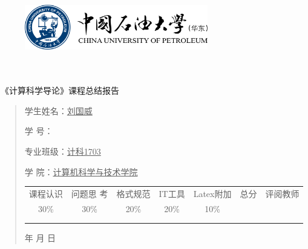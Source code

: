 \documentclass{article}
\renewcommand{\today}{\number\year 年 \number\month 月 \number\day 日}
\begin{document}
\begin{figure}
    \centering
    \includegraphics[width=8cm]{upc.png}

    \label{figupc}
\end{figure}

	\begin{center}
		\quad \\
		\quad \\
		\heiti \fontsize{45}{17} \quad \quad \quad 
		\vskip 1.5cm
		\heiti {} 《计算科学导论》课程总结报告
	\end{center}
	\vskip 2.0cm
		
	\begin{quotation}
		\doublespacing
		
        \par\setlength\parindent{7em}
		\quad 

		学生姓名：\underline{\qquad  刘国威 \qquad \qquad}

		学\hspace{0.61cm} 号：\underline{\qquad}
		
		专业班级：\underline{\qquad 计科1703 \qquad  }
		
        学\hspace{0.61cm} 院：\underline{计算机科学与技术学院}
		\vskip 2cm
		\centering
		\begin{table}[h]
            \centering 
            \begin{tabular}{|c|c|c|c|c|c|c|}
                \hline
                课程认识 & 问题思 考 & 格式规范  & IT工具  & Latex附加  & 总分 & 评阅教师 \\
                30\% & 30\% & 20\% & 20\% & 10\% &  &  \\
                \hline
                 & & & & & &\\
                & & & & & &\\
                \hline
            \end{tabular}
        \end{table}
		\vskip 2cm
		\today
	\end{quotation}
\end{document}

